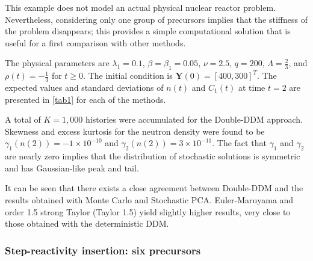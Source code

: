 \documentclass[preprint,12pt,authoryear]{elsarticle}
\begin{document}
This example does not model an actual physical nuclear reactor problem.
Nevertheless, considering only one group of precursors implies that the stiffness of the problem disappears; this provides a simple computational solution that is useful for a first comparison with other methods.

The physical parameters are $\lambda_1=0.1$,  $\beta=\beta_1=0.05$, $\nu=2.5$, $q=200$, $\Lambda=\frac{2}{3}$, and $\rho(t)=-\frac{1}{3}$ for $t\geq 0$.
The initial condition is $\bm{Y}(0)=[400, 300]^T$.
The expected values and standard deviations of $n(t)$ and $C_1(t)$ at time $t=2$ are presented in \cref{tab1} for each of the methods.
\begin{table}[H]
\caption{Results for one group of precursors and step-reactivity insertion $\rho(t)=-1/3$.}\label{tab1}
\end{table}
A total of $K=1,000$ histories were accumulated for the Double-DDM approach.
Skewness and excess kurtosis for the neutron density were found to be $\gamma_1(n(2)) = -1\times 10^{-10}$ and $\gamma_2(n(2)) = 3\times 10^{-11}$.
The fact that $\gamma_1$ and $\gamma_2$ are nearly zero implies that the distribution of stochastic solutions is symmetric and has Gaussian-like peak and tail.

It can be seen that there exists a close agreement between Double-DDM and the results obtained with Monte Carlo and Stochastic PCA.
Euler-Maruyama and order 1.5 strong Taylor (Taylor 1.5) yield slightly higher results, very close to those obtained with the deterministic DDM.

\subsubsection{Step-reactivity insertion: six precursors}\label{sec512}
\end{document}
